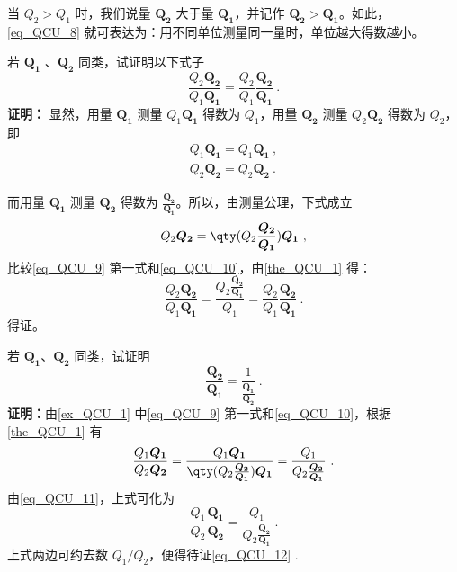 当 $Q_2>Q_1$ 时，我们说量 $\boldsymbol{Q_2}$ 大于量 $\boldsymbol{Q_1}$，并记作 $\boldsymbol{Q_2}>\boldsymbol{Q_1}$。如此，\autoref{eq_QCU_8} 就可表达为：用不同单位测量同一量时，单位越大得数越小。
\begin{example}{}\label{ex_QCU_1}
若 $\boldsymbol{Q_1}$ 、$\boldsymbol{Q_2}$ 同类，试证明以下式子
\begin{equation}\label{eq_QCU_11}
\frac{Q_2\boldsymbol{Q_2}}{Q_1\boldsymbol{Q_1}}=\frac{Q_2}{Q_1}\frac{\boldsymbol{Q_2}}{\boldsymbol{Q_1}}~.
\end{equation}
\textbf{证明：} 显然，用量 $\boldsymbol{Q_1}$ 测量 $Q_1\boldsymbol{Q_1}$ 得数为 $Q_1$，用量 $\boldsymbol{Q_2}$ 测量 $Q_2\boldsymbol{Q_2}$ 得数为 $Q_2$，即
\begin{equation}\label{eq_QCU_9}
\begin{aligned}
Q_1\boldsymbol{Q_1}=Q_1\boldsymbol{Q_1}~,\\
Q_2\boldsymbol{Q_2}=Q_2\boldsymbol{Q_2}~.
\end{aligned}
\end{equation}


而用量 $\boldsymbol{Q_1}$ 测量 $\boldsymbol{Q_2}$ 得数为 $\frac{\boldsymbol{Q_2}}{\boldsymbol{Q_1}}$。所以，由测量公理，下式成立
\begin{equation}\label{eq_QCU_10}
Q_2\boldsymbol{Q_2}=\qty(Q_2\frac{\boldsymbol{Q_2}}{\boldsymbol{Q_1}})\boldsymbol{Q_1}~,
\end{equation}
比较\autoref{eq_QCU_9} 第一式和\autoref{eq_QCU_10}，由\autoref{the_QCU_1} 得：
\begin{equation}
\frac{Q_2\boldsymbol{Q_2}}{Q_1\boldsymbol{Q_1}}=\frac{Q_2\frac{\boldsymbol{Q_2}}{\boldsymbol{Q_1}}}{Q_1}=\frac{Q_2}{Q_1}\frac{\boldsymbol{Q_2}}{\boldsymbol{Q_1}}~.
\end{equation}
得证。
\end{example}
\begin{example}{}\label{ex_QCU_2}
若 $\boldsymbol{Q_1}$、$\boldsymbol{Q_2}$ 同类，试证明
\begin{equation}\label{eq_QCU_12}
\frac{\boldsymbol{Q_2}}{\boldsymbol{{Q_1}}}=\frac{1}{\frac{\boldsymbol{Q_1}}{\boldsymbol{Q_2}}}~.
\end{equation}
\textbf{证明：}由\autoref{ex_QCU_1} 中\autoref{eq_QCU_9} 第一式和\autoref{eq_QCU_10}，根据\autoref{the_QCU_1} 有
\begin{equation}
\frac{Q_1\boldsymbol{Q_1}}{Q_2\boldsymbol{Q_2}}=\frac{Q_1\boldsymbol{Q_1}}{\qty(Q_2\frac{\boldsymbol{Q_2}}{\boldsymbol{Q_1}})\boldsymbol{Q_1}}=\frac{Q_1}{Q_2\frac{\boldsymbol{Q_2}}{\boldsymbol{Q_1}}}~.
\end{equation}
由\autoref{eq_QCU_11}，上式可化为
\begin{equation}
\frac{Q_1}{Q_2}\frac{\boldsymbol{Q_1}}{\boldsymbol{Q_2}}=\frac{Q_1}{Q_2\frac{\boldsymbol{Q_2}}{\boldsymbol{Q_1}}}~.
\end{equation}
上式两边可约去数 $Q_1/Q_2$，便得待证\autoref{eq_QCU_12} .
\end{example}
